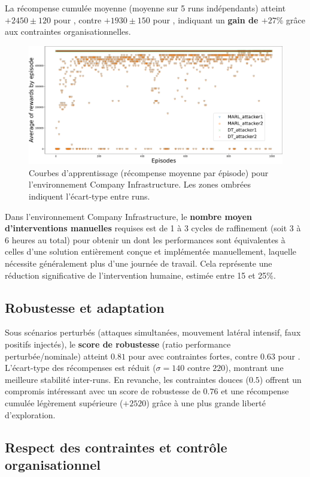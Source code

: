 La récompense cumulée moyenne (moyenne sur 5 runs indépendants) atteint $+2450 \pm 120$ pour , contre $+1930 \pm 150$ pour , indiquant un \textbf{gain de $+27\%$} grâce aux contraintes organisationnelles.

\begin{figure}[h!]
  \centering
  \includegraphics[width=0.75\linewidth]{figures/results_infra_learning.pdf}
  \caption{Courbes d'apprentissage (récompense moyenne par épisode) pour l'environnement Company Infrastructure. Les zones ombrées indiquent l'écart-type entre runs.}
  \label{fig:infra_learning_curves}
\end{figure}

Dans l'environnement Company Infrastructure, le \textbf{nombre moyen d'interventions manuelles} requises est de 1 à 3 cycles de raffinement (soit 3 à 6 heures au total) pour obtenir un  dont les performances sont équivalentes à celles d'une solution entièrement conçue et implémentée manuellement, laquelle nécessite généralement plus d'une journée de travail. Cela représente une réduction significative de l'intervention humaine, estimée entre 15 et 25\%.

\subsection*{Robustesse et adaptation}

Sous scénarios perturbés (attaques simultanées, mouvement latéral intensif, faux positifs injectés), le \textbf{score de robustesse} (ratio performance perturbée/nominale) atteint $0.81$ pour  avec contraintes fortes, contre $0.63$ pour .
L'écart-type des récompenses est réduit ($\sigma = 140$ contre $220$), montrant une meilleure stabilité inter-runs.
En revanche, les contraintes douces ($0.5$) offrent un compromis intéressant avec un score de robustesse de $0.76$ et une récompense cumulée légèrement supérieure ($+2520$) grâce à une plus grande liberté d'exploration.

\subsection*{Respect des contraintes et contrôle organisationnel}

